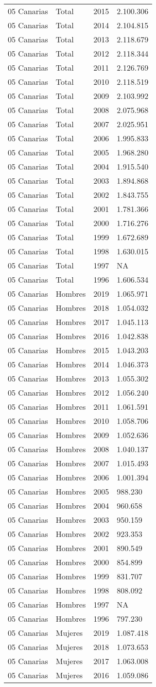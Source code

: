 \documentclass[
]{article}
\begin{document}
\begin{longtable}[]{@{}llrl@{}}
05 Canarias & Total & 2015 & 2.100.306\tabularnewline
05 Canarias & Total & 2014 & 2.104.815\tabularnewline
05 Canarias & Total & 2013 & 2.118.679\tabularnewline
05 Canarias & Total & 2012 & 2.118.344\tabularnewline
05 Canarias & Total & 2011 & 2.126.769\tabularnewline
05 Canarias & Total & 2010 & 2.118.519\tabularnewline
05 Canarias & Total & 2009 & 2.103.992\tabularnewline
05 Canarias & Total & 2008 & 2.075.968\tabularnewline
05 Canarias & Total & 2007 & 2.025.951\tabularnewline
05 Canarias & Total & 2006 & 1.995.833\tabularnewline
05 Canarias & Total & 2005 & 1.968.280\tabularnewline
05 Canarias & Total & 2004 & 1.915.540\tabularnewline
05 Canarias & Total & 2003 & 1.894.868\tabularnewline
05 Canarias & Total & 2002 & 1.843.755\tabularnewline
05 Canarias & Total & 2001 & 1.781.366\tabularnewline
05 Canarias & Total & 2000 & 1.716.276\tabularnewline
05 Canarias & Total & 1999 & 1.672.689\tabularnewline
05 Canarias & Total & 1998 & 1.630.015\tabularnewline
05 Canarias & Total & 1997 & NA\tabularnewline
05 Canarias & Total & 1996 & 1.606.534\tabularnewline
05 Canarias & Hombres & 2019 & 1.065.971\tabularnewline
05 Canarias & Hombres & 2018 & 1.054.032\tabularnewline
05 Canarias & Hombres & 2017 & 1.045.113\tabularnewline
05 Canarias & Hombres & 2016 & 1.042.838\tabularnewline
05 Canarias & Hombres & 2015 & 1.043.203\tabularnewline
05 Canarias & Hombres & 2014 & 1.046.373\tabularnewline
05 Canarias & Hombres & 2013 & 1.055.302\tabularnewline
05 Canarias & Hombres & 2012 & 1.056.240\tabularnewline
05 Canarias & Hombres & 2011 & 1.061.591\tabularnewline
05 Canarias & Hombres & 2010 & 1.058.706\tabularnewline
05 Canarias & Hombres & 2009 & 1.052.636\tabularnewline
05 Canarias & Hombres & 2008 & 1.040.137\tabularnewline
05 Canarias & Hombres & 2007 & 1.015.493\tabularnewline
05 Canarias & Hombres & 2006 & 1.001.394\tabularnewline
05 Canarias & Hombres & 2005 & 988.230\tabularnewline
05 Canarias & Hombres & 2004 & 960.658\tabularnewline
05 Canarias & Hombres & 2003 & 950.159\tabularnewline
05 Canarias & Hombres & 2002 & 923.353\tabularnewline
05 Canarias & Hombres & 2001 & 890.549\tabularnewline
05 Canarias & Hombres & 2000 & 854.899\tabularnewline
05 Canarias & Hombres & 1999 & 831.707\tabularnewline
05 Canarias & Hombres & 1998 & 808.092\tabularnewline
05 Canarias & Hombres & 1997 & NA\tabularnewline
05 Canarias & Hombres & 1996 & 797.230\tabularnewline
05 Canarias & Mujeres & 2019 & 1.087.418\tabularnewline
05 Canarias & Mujeres & 2018 & 1.073.653\tabularnewline
05 Canarias & Mujeres & 2017 & 1.063.008\tabularnewline
05 Canarias & Mujeres & 2016 & 1.059.086\tabularnewline

\end{longtable}
\end{document}
